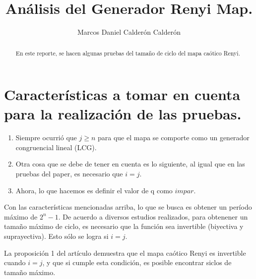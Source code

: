 \documentclass[12pt,3p]{elsarticle}
\begin{document}
\begin{frontmatter}

\title{Análisis del Generador Renyi Map.}



\author{Marcos Daniel Calderón Calderón}







\begin{abstract}
En este reporte, se hacen algunas pruebas del tamaño de ciclo del mapa caótico Renyi. 
\end{abstract}



\end{frontmatter}

\section{Características a tomar en cuenta para la realización de las pruebas.}

\begin{enumerate}
\item Siempre ocurrió que $ j \geq n$ para que el mapa se comporte como un generador congruencial lineal (LCG). 

\item Otra cosa que se debe de tener en cuenta es lo siguiente, al igual que en las pruebas del paper, es necesario que $i=j$. 

\item Ahora, lo que hacemos es definir el valor de q como $impar$.


\end{enumerate}

Con las características mencionadas arriba, lo que se busca es obtener un período máximo de $2^{n}-1$. De acuerdo a diversos estudios realizados, para obtenener un tamaño máximo de ciclo, es necesario que la función sea invertible (biyectiva y suprayectiva). Esto sólo se logra si $i=j$. 

La proposición 1 del artículo  \cite{Addabbo} demuestra que el mapa caótico Renyi es invertible cuando $i=j$,  y que si cumple esta condición, es posible encontrar siclos de tamaño máximo.
\end{document}
